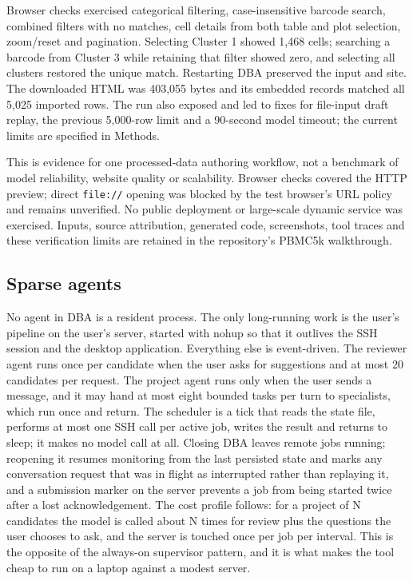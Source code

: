 \documentclass[11pt,a4paper]{article}
\begin{document}
Browser checks exercised categorical filtering, case-insensitive barcode
search, combined filters with no matches, cell details from both table
and plot selection, zoom/reset and pagination. Selecting Cluster 1 showed
1,468 cells; searching a barcode from Cluster 3 while retaining that
filter showed zero, and selecting all clusters restored the unique
match. Restarting DBA preserved the input and site. The downloaded HTML
was 403,055 bytes and its embedded records matched all 5,025 imported
rows. The run also exposed and led to fixes for file-input draft replay,
the previous 5,000-row limit and a 90-second model timeout; the current
limits are specified in Methods.

This is evidence for one processed-data authoring workflow, not a
benchmark of model reliability, website quality or scalability. Browser
checks covered the HTTP preview; direct \texttt{file://} opening was
blocked by the test browser's URL policy and remains unverified. No
public deployment or large-scale dynamic service was exercised. Inputs,
source attribution, generated code, screenshots, tool traces and these
verification limits are retained in the repository's PBMC5k walkthrough.

\subsection{Sparse agents}\label{sparse-agents}

No agent in DBA is a resident process. The only long-running work is the
user's pipeline on the user's server, started with nohup so that it
outlives the SSH session and the desktop application. Everything else is
event-driven. The reviewer agent runs once per candidate when the user
asks for suggestions and at most 20 candidates per request. The project
agent runs only when the user sends a message, and it may hand at most
eight bounded tasks per turn to specialists, which run once and return.
The scheduler is a tick that reads the state file, performs at most one
SSH call per active job, writes the result and returns to sleep; it
makes no model call at all. Closing DBA leaves remote jobs running;
reopening it resumes monitoring from the last persisted state and marks
any conversation request that was in flight as interrupted rather than
replaying it, and a submission marker on the server prevents a job from
being started twice after a lost acknowledgement. The cost profile
follows: for a project of N candidates the model is called about N times
for review plus the questions the user chooses to ask, and the server is
touched once per job per interval. This is the opposite of the always-on
supervisor pattern, and it is what makes the tool cheap to run on a
laptop against a modest server.
\end{document}
